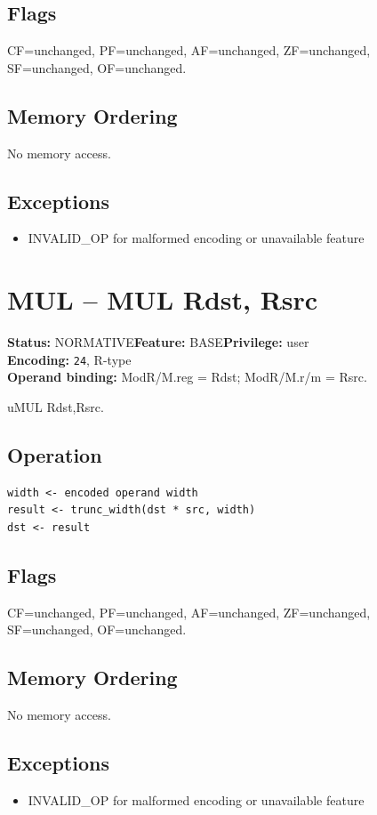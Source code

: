 \documentclass[10pt]{article}
\begin{document}
\subsection*{Flags}
CF=unchanged, PF=unchanged, AF=unchanged, ZF=unchanged, SF=unchanged, OF=unchanged.
\subsection*{Memory Ordering}
No memory access.
\subsection*{Exceptions}
\begin{itemize}
\item INVALID\_OP for malformed encoding or unavailable feature
\end{itemize}
\clearpage

\section{MUL -- MUL Rdst, Rsrc}
\textbf{Status:} NORMATIVE\quad \textbf{Feature:} BASE\quad \textbf{Privilege:} user\\
\textbf{Encoding:} \texttt{24}, R-type\\
\textbf{Operand binding:} ModR/M.reg = Rdst; ModR/M.r/m = Rsrc.

uMUL Rdst,Rsrc.

\subsection*{Operation}
\begin{lstlisting}
width <- encoded operand width
result <- trunc_width(dst * src, width)
dst <- result
\end{lstlisting}
\subsection*{Flags}
CF=unchanged, PF=unchanged, AF=unchanged, ZF=unchanged, SF=unchanged, OF=unchanged.
\subsection*{Memory Ordering}
No memory access.
\subsection*{Exceptions}
\begin{itemize}
\item INVALID\_OP for malformed encoding or unavailable feature
\end{itemize}
\clearpage
\end{document}
